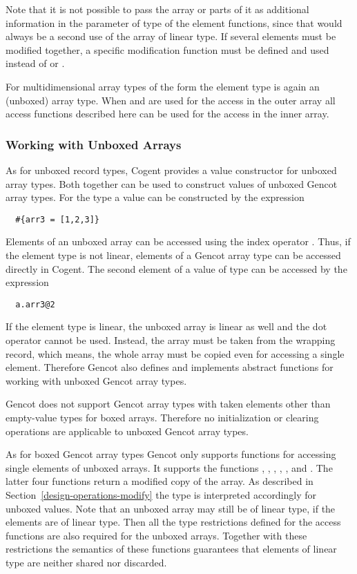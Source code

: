 Note that it is not possible
to pass the array or parts of it as additional information in the parameter of type  of the element
functions, since that would always be
a second use of the array of linear type. If several elements must be modified together, a specific modification function
must be defined and used instead of  or .

For multidimensional array types of the form  the element type is again an (unboxed) array type.
When  and  are used for the access in the outer array all access functions described here
can be used for the access in the inner array.

\subsubsection{Working with Unboxed Arrays}

As for unboxed record types, Cogent provides a value constructor for unboxed array types. Both together can be used to 
construct values of unboxed Gencot array types. For the type  a value can be constructed by the expression
\begin{verbatim}
  #{arr3 = [1,2,3]}
\end{verbatim}

Elements of an unboxed array can be accessed using the index operator . Thus, if the element type is not linear,
elements of a Gencot array type can be accessed directly in Cogent. The second element of a value  of type 
can be accessed by the expression
\begin{verbatim}
  a.arr3@2
\end{verbatim}

If the element type is linear, the unboxed array is linear as well and the dot operator cannot be used. Instead, the array must be
taken from the wrapping record, which means, the whole array must be copied even for accessing a single element.
Therefore Gencot also defines and implements abstract functions for working with unboxed Gencot array types.

Gencot does not support Gencot array types with taken elements other than empty-value types for boxed arrays. Therefore no
initialization or clearing operations are applicable to unboxed Gencot array types.

As for boxed Gencot array types Gencot only supports functions for accessing single elements of unboxed arrays. It supports the 
functions , , , , , and .
The latter four functions return a modified copy of the array. As described in Section~\ref{design-operations-modify} 
the  type is interpreted accordingly for unboxed values. Note that
an unboxed array may still be of linear type, if the elements are of linear type. Then all the type restrictions
defined for the access functions are also required for the unboxed arrays. Together with these restrictions the semantics
of these functions guarantees that elements of linear type are neither shared nor discarded.

